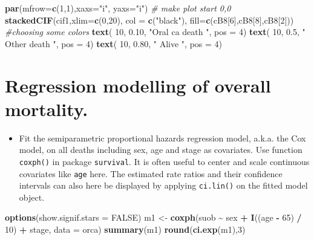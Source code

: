 \documentclass[
]{book}
\newenvironment{Shaded}{\begin{snugshade}}{\end{snugshade}}
\newcommand{\AttributeTok}[1]{\textcolor[rgb]{0.13,0.29,0.53}{#1}}
\newcommand{\CommentTok}[1]{\textcolor[rgb]{0.56,0.35,0.01}{\textit{#1}}}
\newcommand{\ConstantTok}[1]{\textcolor[rgb]{0.56,0.35,0.01}{#1}}
\newcommand{\DecValTok}[1]{\textcolor[rgb]{0.00,0.00,0.81}{#1}}
\newcommand{\FloatTok}[1]{\textcolor[rgb]{0.00,0.00,0.81}{#1}}
\newcommand{\FunctionTok}[1]{\textcolor[rgb]{0.13,0.29,0.53}{\textbf{#1}}}
\newcommand{\NormalTok}[1]{#1}
\newcommand{\OtherTok}[1]{\textcolor[rgb]{0.56,0.35,0.01}{#1}}
\newcommand{\SpecialCharTok}[1]{\textcolor[rgb]{0.81,0.36,0.00}{\textbf{#1}}}
\newcommand{\StringTok}[1]{\textcolor[rgb]{0.31,0.60,0.02}{#1}}
\providecommand{\tightlist}{%
  \setlength{\itemsep}{0pt}\setlength{\parskip}{0pt}}
\begin{document}
\begin{Shaded}
\begin{Highlighting}[]
\FunctionTok{par}\NormalTok{(}\AttributeTok{mfrow=}\FunctionTok{c}\NormalTok{(}\DecValTok{1}\NormalTok{,}\DecValTok{1}\NormalTok{),}\AttributeTok{xaxs=}\StringTok{"i"}\NormalTok{, }\AttributeTok{yaxs=}\StringTok{"i"}\NormalTok{) }\CommentTok{\# make plot start 0,0}
\FunctionTok{stackedCIF}\NormalTok{(cif1,}\AttributeTok{xlim=}\FunctionTok{c}\NormalTok{(}\DecValTok{0}\NormalTok{,}\DecValTok{20}\NormalTok{),}
           \AttributeTok{col =} \FunctionTok{c}\NormalTok{(}\StringTok{"black"}\NormalTok{),}
           \AttributeTok{fill=}\FunctionTok{c}\NormalTok{(cB8[}\DecValTok{6}\NormalTok{],cB8[}\DecValTok{8}\NormalTok{],cB8[}\DecValTok{2}\NormalTok{])) }\CommentTok{\#choosing some colors }
\FunctionTok{text}\NormalTok{( }\DecValTok{10}\NormalTok{, }\FloatTok{0.10}\NormalTok{, }\StringTok{"Oral ca death "}\NormalTok{, }\AttributeTok{pos =} \DecValTok{4}\NormalTok{)}
\FunctionTok{text}\NormalTok{( }\DecValTok{10}\NormalTok{, }\FloatTok{0.5}\NormalTok{, }\StringTok{" Other death "}\NormalTok{, }\AttributeTok{pos =} \DecValTok{4}\NormalTok{)}
\FunctionTok{text}\NormalTok{( }\DecValTok{10}\NormalTok{, }\FloatTok{0.80}\NormalTok{, }\StringTok{" Alive "}\NormalTok{, }\AttributeTok{pos =} \DecValTok{4}\NormalTok{)}
\end{Highlighting}
\end{Shaded}

\section{Regression modelling of overall mortality.}\label{regression-modelling-of-overall-mortality.}

\begin{itemize}
\tightlist
\item
  Fit the semiparametric proportional hazards
  regression model, a.k.a. the Cox model, on all deaths including
  sex, age and stage as covariates. Use function
  \texttt{coxph()} in package \texttt{survival}.
  It is often useful to center and scale
  continuous covariates like \texttt{age} here.
  The estimated rate ratios and their confidence intervals
  can also here be displayed by applying \texttt{ci.lin()}
  on the fitted model object.
\end{itemize}

\begin{Shaded}
\begin{Highlighting}[]
\FunctionTok{options}\NormalTok{(}\AttributeTok{show.signif.stars =} \ConstantTok{FALSE}\NormalTok{)}
\NormalTok{m1 }\OtherTok{\textless{}{-}} \FunctionTok{coxph}\NormalTok{(suob }\SpecialCharTok{\textasciitilde{}}\NormalTok{ sex }\SpecialCharTok{+} \FunctionTok{I}\NormalTok{((age }\SpecialCharTok{{-}} \DecValTok{65}\NormalTok{) }\SpecialCharTok{/} \DecValTok{10}\NormalTok{) }\SpecialCharTok{+}\NormalTok{ stage, }\AttributeTok{data =}\NormalTok{ orca)}
\FunctionTok{summary}\NormalTok{(m1)}
\FunctionTok{round}\NormalTok{(}\FunctionTok{ci.exp}\NormalTok{(m1),}\DecValTok{3}\NormalTok{)}
\end{Highlighting}
\end{Shaded}
\end{document}
